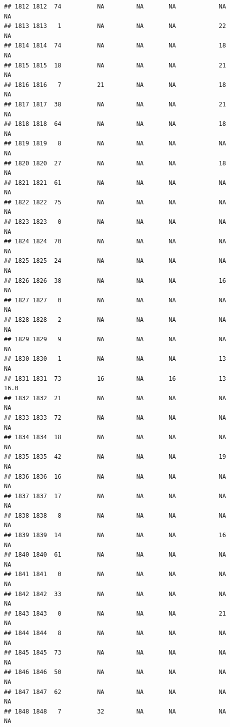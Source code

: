 \documentclass[man]{apa6}
\begin{document}
\begin{verbatim}
## 1812 1812  74          NA         NA       NA            NA       NA
## 1813 1813   1          NA         NA       NA            22       NA
## 1814 1814  74          NA         NA       NA            18       NA
## 1815 1815  18          NA         NA       NA            21       NA
## 1816 1816   7          21         NA       NA            18       NA
## 1817 1817  38          NA         NA       NA            21       NA
## 1818 1818  64          NA         NA       NA            18       NA
## 1819 1819   8          NA         NA       NA            NA       NA
## 1820 1820  27          NA         NA       NA            18       NA
## 1821 1821  61          NA         NA       NA            NA       NA
## 1822 1822  75          NA         NA       NA            NA       NA
## 1823 1823   0          NA         NA       NA            NA       NA
## 1824 1824  70          NA         NA       NA            NA       NA
## 1825 1825  24          NA         NA       NA            NA       NA
## 1826 1826  38          NA         NA       NA            16       NA
## 1827 1827   0          NA         NA       NA            NA       NA
## 1828 1828   2          NA         NA       NA            NA       NA
## 1829 1829   9          NA         NA       NA            NA       NA
## 1830 1830   1          NA         NA       NA            13       NA
## 1831 1831  73          16         NA       16            13     16.0
## 1832 1832  21          NA         NA       NA            NA       NA
## 1833 1833  72          NA         NA       NA            NA       NA
## 1834 1834  18          NA         NA       NA            NA       NA
## 1835 1835  42          NA         NA       NA            19       NA
## 1836 1836  16          NA         NA       NA            NA       NA
## 1837 1837  17          NA         NA       NA            NA       NA
## 1838 1838   8          NA         NA       NA            NA       NA
## 1839 1839  14          NA         NA       NA            16       NA
## 1840 1840  61          NA         NA       NA            NA       NA
## 1841 1841   0          NA         NA       NA            NA       NA
## 1842 1842  33          NA         NA       NA            NA       NA
## 1843 1843   0          NA         NA       NA            21       NA
## 1844 1844   8          NA         NA       NA            NA       NA
## 1845 1845  73          NA         NA       NA            NA       NA
## 1846 1846  50          NA         NA       NA            NA       NA
## 1847 1847  62          NA         NA       NA            NA       NA
## 1848 1848   7          32         NA       NA            NA       NA

\end{verbatim}
\end{document}

